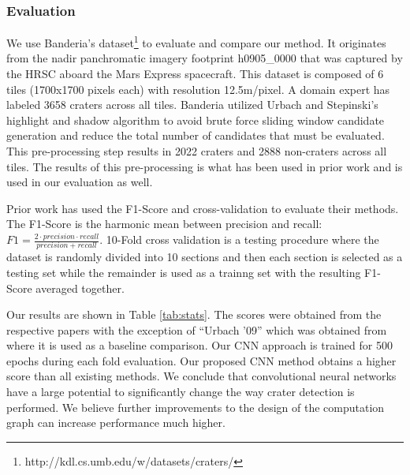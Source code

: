 \documentclass[twoside]{article}
\begin{document}
\vspace{-12pt}
\subsubsection*{Evaluation}
\vspace{-8pt}

We use Banderia's \cite{bandeira_automatic_2010} dataset\footnote{http://kdl.cs.umb.edu/w/datasets/craters/} to evaluate and compare our method.  It originates from the nadir panchromatic imagery footprint h0905\_0000 that was captured by the HRSC aboard the Mars Express spacecraft. This dataset is composed of 6 tiles (1700x1700 pixels each) with resolution 12.5m/pixel. A domain expert has labeled 3658 craters across all tiles. Banderia utilized Urbach and Stepinski's \cite{urbach_automatic_2009} highlight and shadow algorithm to avoid brute force sliding window candidate generation and reduce the total number of candidates that must be evaluated. This pre-processing step results in 2022 craters and 2888 non-craters across all tiles. The results of this pre-processing is what has been used in prior work and is used in our evaluation as well.  


Prior work has used the F1-Score and cross-validation to evaluate their methods. The F1-Score is the harmonic mean between precision and recall: $F1 = \frac{2\cdot precision \cdot recall}{precision + recall}$. 10-Fold cross validation is a testing procedure where the dataset is randomly divided into 10 sections and then each section is selected as a testing set while the remainder is used as a trainng set with the resulting F1-Score averaged together.


Our results are shown in Table \ref{tab:stats}. The scores were obtained from the respective papers with the exception of ``Urbach '09'' which was obtained from \cite{bandeira_automatic_2010} where it is used as a baseline comparison. Our CNN approach is trained for 500 epochs during each fold evaluation. Our proposed CNN method obtains a higher score than all existing methods. We conclude that convolutional neural networks have a large potential to significantly change the way crater detection is performed. We believe further improvements to the design of the computation graph can increase performance much higher.
\end{document}
